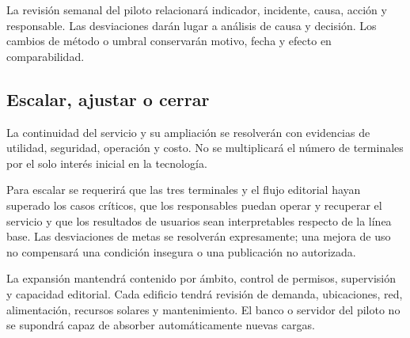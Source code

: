 La revisión semanal del piloto relacionará indicador, incidente, causa, acción y responsable. Las desviaciones darán lugar a análisis de causa y decisión. Los cambios de método o umbral conservarán motivo, fecha y efecto en comparabilidad.

\subsection{Escalar, ajustar o cerrar}
La continuidad del servicio y su ampliación se resolverán con evidencias de utilidad, seguridad, operación y costo. No se multiplicará el número de terminales por el solo interés inicial en la tecnología.


Para escalar se requerirá que las tres terminales y el flujo editorial hayan superado los casos críticos, que los responsables puedan operar y recuperar el servicio y que los resultados de usuarios sean interpretables respecto de la línea base. Las desviaciones de metas se resolverán expresamente; una mejora de uso no compensará una condición insegura o una publicación no autorizada.

La expansión mantendrá contenido por ámbito, control de permisos, supervisión y capacidad editorial. Cada edificio tendrá revisión de demanda, ubicaciones, red, alimentación, recursos solares y mantenimiento. El banco o servidor del piloto no se supondrá capaz de absorber automáticamente nuevas cargas.


